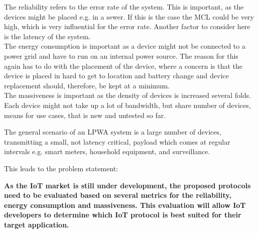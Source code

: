 The reliability refers to the error rate of the system. This is important, as the devices might be placed e.g. in a sewer. If this is the case the \gls{MCL} could be very high, which is very influential for the error rate. Another factor to consider here is the latency of the system.\\
The energy consumption is important as a device might not be connected to a power grid and have to run on an internal power source. The reason for this again has to do with the placement of the device, where a concern is that the device is placed in hard to get to location and battery change and device replacement should, therefore, be kept at a minimum.\\
The massiveness is important as the density of devices is increased several folds. Each device might not take up a lot of bandwidth, but share number of devices, means for use cases, that is new and untested so far.

The general scenario of an LPWA system is a large number of devices, transmitting a small, not latency critical, payload which comes at regular intervals e.g. smart meters, household equipment, and surveillance. %



This leads to the problem statement:
\begin{center}
\textbf{As the IoT market is still under development, the proposed protocols need to be evaluated based on several metrics for the reliability, energy consumption and massiveness. This evaluation will allow IoT developers to determine which IoT protocol is best suited for their target application.}
\end{center}

